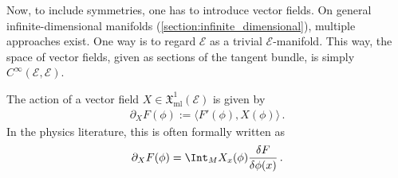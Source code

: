     Now, to include symmetries, one has to introduce vector fields. On general infinite-dimensional manifolds (\cref{section:infinite_dimensional}), multiple approaches exist. One way is to regard $\mathcal{E}$ as a trivial $\mathcal{E}$-manifold. This way, the space of vector fields, given as sections of the tangent bundle, is simply $C^\infty(\mathcal{E},\mathcal{E})$.

    The action of a vector field $X\in\mathfrak{X}^1_{\text{ml}}(\mathcal{E})$ is given by
    \begin{gather}
        \partial_XF(\phi) := \bigl\langle F'(\phi),X(\phi) \bigr\rangle\,.
    \end{gather}
    In the physics literature, this is often formally written as
    \begin{gather}
        \partial_XF(\phi) = \Int_MX_x(\phi)\frac{\delta F}{\delta\phi(x)}\,.
    \end{gather}

